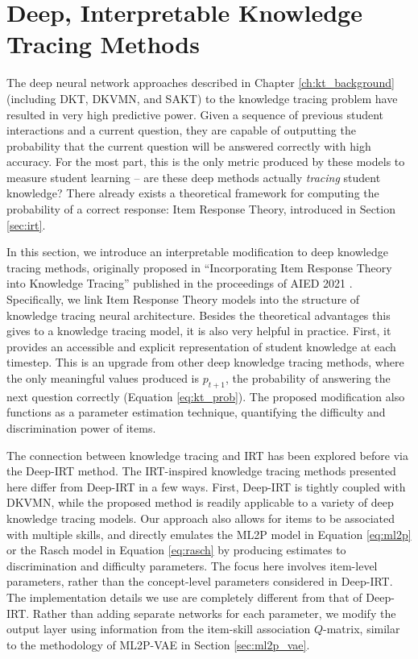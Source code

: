 \chapter{Deep, Interpretable Knowledge Tracing Methods} \label{ch:kt_methods}

The deep neural network approaches described in Chapter \ref{ch:kt_background} (including DKT, DKVMN, and SAKT) to the knowledge tracing problem have resulted in very high predictive power. Given a sequence of previous student interactions and a current question, they are capable of outputting the probability that the current question will be answered correctly with high accuracy. For the most part, this is the only metric produced by these models to measure student learning -- are these deep methods actually \textit{tracing} student knowledge? There already exists a theoretical framework for computing the probability of a correct response: Item Response Theory, introduced in Section \ref{sec:irt}.

In this section, we introduce an interpretable modification to deep knowledge tracing methods, originally proposed in ``Incorporating Item Response Theory into Knowledge Tracing'' published in the proceedings of AIED 2021 \cite{kt_irt}. Specifically, we link Item Response Theory models into the structure of knowledge tracing neural architecture. Besides the theoretical advantages this gives to a knowledge tracing model, it is also very helpful in practice. First, it provides an accessible and explicit representation of student knowledge at each timestep. This is an upgrade from other deep knowledge tracing methods, where the only meaningful values produced is $p_{t+1}$, the probability of answering the next question correctly (Equation \ref{eq:kt_prob}). The proposed modification also functions as a parameter estimation technique, quantifying the difficulty and discrimination power of items.

The connection between knowledge tracing and IRT has been explored before via the Deep-IRT method. The IRT-inspired knowledge tracing methods presented here differ from Deep-IRT in a few ways. First, Deep-IRT is tightly coupled with DKVMN, while the proposed method is readily applicable to a variety of deep knowledge tracing models. Our approach also allows for items to be associated with multiple skills, and directly emulates the ML2P model in Equation \ref{eq:ml2p} or the Rasch model in Equation \ref{eq:rasch} by producing estimates to discrimination and difficulty parameters. The focus here involves item-level parameters, rather than the concept-level parameters considered in Deep-IRT. The implementation details we use are completely different from that of Deep-IRT. Rather than adding separate networks for each parameter, we modify the output layer using information from the item-skill association $Q$-matrix, similar to the methodology of ML2P-VAE in Section \ref{sec:ml2p_vae}.


